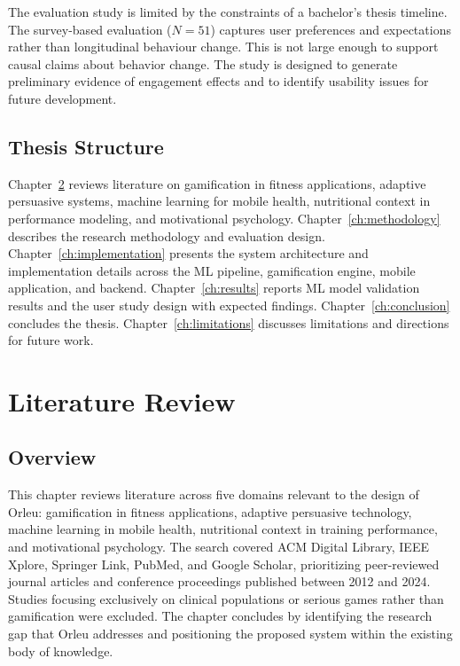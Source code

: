 \documentclass[12pt, a4paper]{report}
\begin{document}
The evaluation study is limited by the constraints of a bachelor's thesis timeline. The survey-based evaluation (\(N = 51\)) captures user preferences and expectations rather than longitudinal behaviour change. This is not large enough to support causal claims about behavior change. The study is designed to generate preliminary evidence of engagement effects and to identify usability issues for future development.

\section{Thesis Structure}

Chapter~\ref{ch:litreview} reviews literature on gamification in fitness applications, adaptive persuasive systems, machine learning for mobile health, nutritional context in performance modeling, and motivational psychology. Chapter~\ref{ch:methodology} describes the research methodology and evaluation design. Chapter~\ref{ch:implementation} presents the system architecture and implementation details across the ML pipeline, gamification engine, mobile application, and backend. Chapter~\ref{ch:results} reports ML model validation results and the user study design with expected findings. Chapter~\ref{ch:conclusion} concludes the thesis. Chapter~\ref{ch:limitations} discusses limitations and directions for future work.

\chapter{Literature Review}
\label{ch:litreview}

\section{Overview}

This chapter reviews literature across five domains relevant to the design of Orleu: gamification in fitness applications, adaptive persuasive technology, machine learning in mobile health, nutritional context in training performance, and motivational psychology. The search covered ACM Digital Library, IEEE Xplore, Springer Link, PubMed, and Google Scholar, prioritizing peer-reviewed journal articles and conference proceedings published between 2012 and 2024. Studies focusing exclusively on clinical populations or serious games rather than gamification were excluded. The chapter concludes by identifying the research gap that Orleu addresses and positioning the proposed system within the existing body of knowledge.
\end{document}

